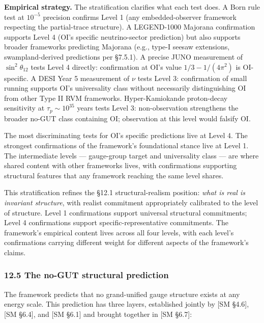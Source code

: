 \documentclass[
]{article}
\begin{document}
\textbf{Empirical strategy.} The stratification clarifies what each test
does. A Born rule test at \(10^{-5}\) precision confirms Level 1 (any
embedded-observer framework respecting the partial-trace structure). A
LEGEND-1000 Majorana confirmation supports Level 4 (OI's specific
neutrino-sector prediction) but also supports broader frameworks
predicting Majorana (e.g., type-I seesaw extensions, swampland-derived
predictions per §7.5.1). A precise JUNO measurement of
\(\sin^2\theta_{12}\) tests Level 4 directly: confirmation at OI's value
\(1/3 - 1/(4\pi^2)\) is OI-specific. A DESI Year 5 measurement of
\(\nu\) tests Level 3: confirmation of small running supports OI's
universality class without necessarily distinguishing OI from other Type
II RVM frameworks. Hyper-Kamiokande proton-decay sensitivity at
\(\tau_p \sim 10^{35}\) years tests Level 3: non-observation strengthens
the broader no-GUT class containing OI; observation at this level would
falsify OI.

The most discriminating tests for OI's specific predictions live at
Level 4. The strongest confirmations of the framework's foundational
stance live at Level 1. The intermediate levels --- gauge-group target
and universality class --- are where shared content with other
frameworks lives, with confirmations supporting structural features that
any framework reaching the same level shares.

This stratification refines the §12.1 structural-realism position:
\emph{what is real is invariant structure}, with realist commitment
appropriately calibrated to the level of structure. Level 1
confirmations support universal structural commitments; Level 4
confirmations support specific-representative commitments. The
framework's empirical content lives across all four levels, with each
level's confirmations carrying different weight for different aspects of
the framework's claims.

\hypertarget{the-no-gut-structural-prediction}{%
\subsubsection{12.5 The no-GUT structural
prediction}\label{the-no-gut-structural-prediction}}

The framework predicts that no grand-unified gauge structure exists at
any energy scale. This prediction has three layers, established jointly
by {[}SM §4.6{]}, {[}SM §6.4{]}, and {[}SM §6.1{]} and brought together
in {[}SM §6.7{]}:
\end{document}
